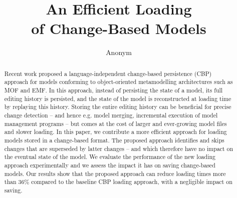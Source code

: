\documentclass{llncs}
\begin{document}
\renewcommand{\thelstlisting}{\arabic{lstlisting}}
\renewcommand{\labelitemi}{$\bullet$}
\newcommand{\dk}[1]{\textbf{[DK: #1]}}

\title{An Efficient Loading \\ of Change-Based Models}
%
%
\author{
    Anonym%
}
%
%
%


\maketitle              %
\begin{abstract}

Recent work proposed a language-independent change-based persistence (CBP) approach for models conforming to object-oriented metamodelling architectures such as MOF and EMF. In this approach, instead of persisting the state of a model, its full editing history is persisted, and the state of the model is reconstructed at loading time by replaying this history. Storing the entire editing history can be beneficial for precise change detection -- and hence e.g. model merging, incremental execution of model management programs -- but comes at the cost of larger and ever-growing model files and slower loading. In this paper, we contribute a more efficient approach for loading models stored in a change-based format. The proposed approach identifies and skips changes that are superseded by latter changes -- and which therefore have no impact on the eventual state of the model. We evaluate the performance of the new loading approach experimentally and we assess the impact it has on saving change-based models. Our results show that the proposed approach can reduce loading times more than 36\% compared to the baseline CBP loading approach, with a negligible impact on saving.

\end{abstract}
\end{document}
